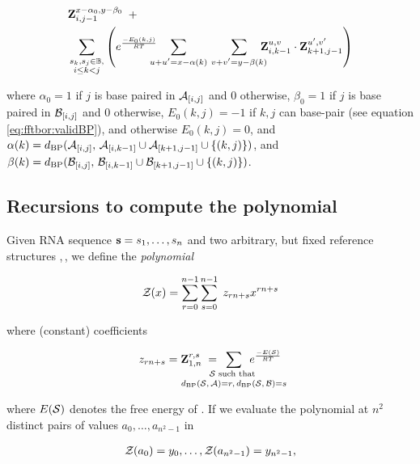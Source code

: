\begin{align}
\label{eq:ffttwo:bfZabij}
\begin{split}
& \bfZ{x-\alpha_0,y-\beta_0}{i,j-1}\enspace + \\
& \sum_{\substack{s_k,s_j \in \bpSet, \\ i \le k<j}}
\left(
\boltzNuss{k,j}\quad
\sum_{\mathclap{u+u'=x-\alpha(k)}}\hspace{3.75em}
\sum_{\mathclap{v+v'=y-\beta(k)}}\quad
\bfZ{u,v}{i,k-1} \cdot \bfZ{u',v'}{k+1,j-1}
\right)
\end{split}
\end{align}

where $\alpha_0 = 1$ if $j$ is base paired in $\mathcal A_{[i,j]}$ and 0 otherwise,
$\beta_0 = 1$ if $j$ is base paired in $\mathcal B_{[i,j]}$ and 0 otherwise,
$E_0(k,j)=-1$ if $k,j$ can base-pair
(see equation \ref{eq:fftbor:validBP}), and otherwise $E_0(k,j)=0$, and
$\alpha(k) =
d_{\text{BP}}(\mathcal A_{[i,j]},\,\mathcal A_{[i,k-1]} \cup \mathcal A_{[k+1,j-1]} \cup \{ (k,j) \})$,
and
$\beta(k) =
d_{\text{BP}}(\mathcal B_{[i,j]},\,\mathcal B_{[i,k-1]} \cup \mathcal B_{[k+1,j-1]} \cup \{ (k,j) \})$.

\subsection{Recursions to compute the polynomial
\texorpdfstring{}{}}
\label{subsec:ffttwo:polynomial}

Given RNA sequence ${\bf s} = s_1,\dots,s_n$
and two arbitrary, but fixed reference
structures \strA,\,\strB, we define the {\em polynomial}

\begin{align}
\label{eq:ffttwo:zOfX}
\emZ{} = \sum_{r=0}^{n-1} \sum_{s=0}^{n-1}\; z_{rn+s} x^{rn+s}
\end{align}

where (constant) coefficients

\begin{align}
z_{rn+s} = \bfZ{r,s}{1,n}\;=
\enspace\sum_{\mathclap{\substack{
\str \text{ such that } \rule[-.5ex]{0pt}{0pt} \\
\dBP{\str}{\strA} = r,\,\dBP{\str}{\strB} = s
}}}\enspace
\boltzF{\str}
\end{align}

where $E(\mathcal S)$ denotes the free energy of \str.
If we evaluate the polynomial \emZ{} at $n^2$ distinct pairs of values
$a_0,\dots,a_{n^2-1}$ in

\begin{align}
\label{eq:ffttwo:solutionsForAlpha}
\emZof{}{a_0} = y_{0}, \dots, \emZof{}{a_{n^2-1}} = y_{n^2-1},
\end{align}

